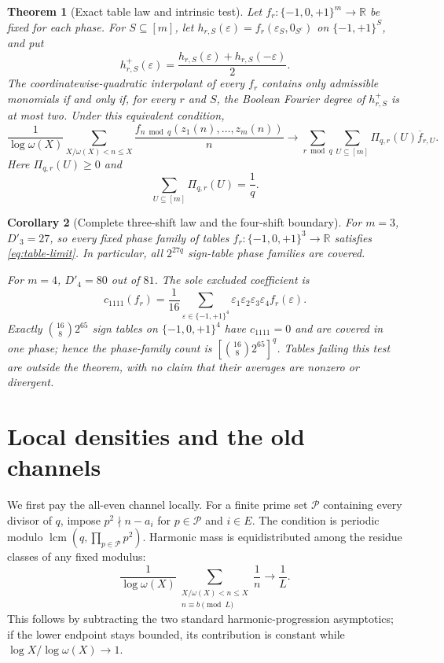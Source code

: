 \documentclass[11pt]{article}
\newtheorem{theorem}{Theorem}[section]
\newtheorem{corollary}[theorem]{Corollary}
\theoremstyle{definition}
\theoremstyle{remark}
\newcommand{\T}{\{-1,0,+1\}}
\begin{document}
\begin{theorem}[Exact table law and intrinsic test]
\label{thm:table}
Let \(f_r:\T^m\to\mathbb R\) be fixed for each phase.  For
\(S\subseteq[m]\), let
\(h_{r,S}(\varepsilon)=f_r(\varepsilon_S,0_{S^c})\) on
\(\{-1,+1\}^S\), and put
\[
 h_{r,S}^{+}(\varepsilon)
 =\frac{h_{r,S}(\varepsilon)+h_{r,S}(-\varepsilon)}2.
\]
The coordinatewise-quadratic interpolant of every \(f_r\) contains only
admissible monomials if and only if, for every \(r\) and \(S\), the Boolean Fourier
degree of \(h_{r,S}^{+}\) is at most two.  Under this equivalent condition,
\begin{equation}
 \frac1{\log\omega(X)}\sum_{X/\omega(X)<n\leq X}
 \frac{f_{n\bmod q}(z_1(n),\ldots,z_m(n))}{n}
 \longrightarrow
 \sum_{r\bmod q}\sum_{U\subseteq[m]}
 \Pi_{q,r}(U)\overline f_{r,U}.
 \label{eq:table-limit}
\end{equation}
Here \(\Pi_{q,r}(U)\geq0\) and
\begin{equation}
 \sum_{U\subseteq[m]}\Pi_{q,r}(U)=\frac1q.
 \label{eq:pi-mass}
\end{equation}
\end{theorem}

\begin{corollary}[Complete three-shift law and the four-shift boundary]
\label{cor:three-four}
For \(m=3\), \(D'_3=27\), so every fixed phase family of tables
\(f_r:\T^3\to\mathbb R\) satisfies \eqref{eq:table-limit}.  In particular,
all \(2^{27q}\) sign-table phase families are covered.

For \(m=4\), \(D'_4=80\) out of \(81\).  The sole excluded coefficient is
\begin{equation}
 c_{1111}(f_r)=\frac1{16}
 \sum_{\varepsilon\in\{-1,+1\}^4}
 \varepsilon_1\varepsilon_2\varepsilon_3\varepsilon_4 f_r(\varepsilon).
 \label{eq:c1111}
\end{equation}
Exactly \(\binom{16}{8}2^{65}\) sign tables on \(\T^4\) have
\(c_{1111}=0\) and are covered in one phase; hence the phase-family count
is \([\binom{16}{8}2^{65}]^q\).  Tables failing this test are outside the
theorem, with no claim that their averages are nonzero or divergent.
\end{corollary}

\section{Local densities and the old channels}

We first pay the all-even channel locally.  For a finite prime set
\(\mathcal P\) containing every divisor of \(q\), impose
\(p^2\nmid n-a_i\) for \(p\in\mathcal P\) and \(i\in E\).  The condition
is periodic modulo
\(\operatorname{lcm}(q,\prod_{p\in\mathcal P}p^2)\).  Harmonic mass is
equidistributed among the residue classes of any fixed modulus:
\begin{equation}
 \frac1{\log\omega(X)}
 \sum_{\substack{X/\omega(X)<n\leq X\\n\equiv b\pmod L}}
 \frac1n\longrightarrow\frac1L.
 \label{eq:harmonic-ap}
\end{equation}
This follows by subtracting the two standard harmonic-progression
asymptotics; if the lower endpoint stays bounded, its contribution is
constant while \(\log X/\log\omega(X)\to1\).
\end{document}
